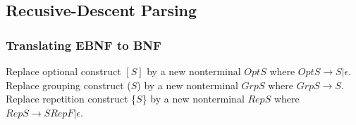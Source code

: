 \subsection{Recusive-Descent Parsing}
\subsubsection{Translating EBNF to BNF}

Replace optional construct $[S]$ by a new nonterminal $OptS$ where $OptS \rightarrow S | \epsilon$.\\
Replace grouping construct ($S$) by a new nonterminal $GrpS$ where $GrpS \rightarrow S$.\\
Replace repetition construct \{$S$\} by a new nonterminal $RepS$ where $RepS \rightarrow S RepF | \epsilon$.\\